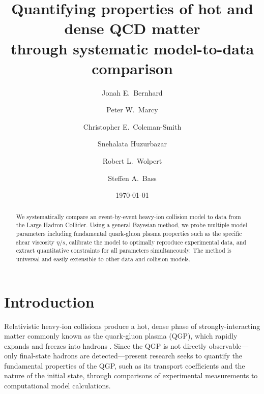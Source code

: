 \documentclass[aps,prc,reprint,superscriptaddress,amsmath]{revtex4-1}
\begin{document}
\title{Quantifying properties of hot and dense QCD matter \\ through systematic model-to-data comparison}

\author{Jonah E.\ Bernhard}

\author{Peter W.\ Marcy}

\author{Christopher E.\ Coleman-Smith}

\author{Snehalata Huzurbazar}

\author{Robert L.\ Wolpert}

\author{Steffen A.\ Bass}

\date{\today}

\begin{abstract}
  We systematically compare an event-by-event heavy-ion collision model to data from the Large Hadron Collider.
  Using a general Bayesian method, we probe multiple model parameters including fundamental quark-gluon plasma properties such as the specific shear viscosity $\eta/s$, calibrate the model to optimally reproduce experimental data, and extract quantitative constraints for all parameters simultaneously.
  The method is universal and easily extensible to other data and collision models.
\end{abstract}

\maketitle


\section{Introduction}

Relativistic heavy-ion collisions produce a hot, dense phase of strongly-interacting matter commonly known as the quark-gluon plasma (QGP), which rapidly expands and freezes into hadrons \cite{Arsene:2004fa,Adcox:2004mh,Back:2004je,Adams:2005dq,Gyulassy:2004zy,Muller:2006ee,Muller:2012zq}.
Since the QGP is not directly observable---only final-state hadrons are detected---present research seeks to quantify the fundamental properties of the QGP, such as its transport coefficients and the nature of the initial state, through comparisons of experimental measurements to computational model calculations.
\end{document}
